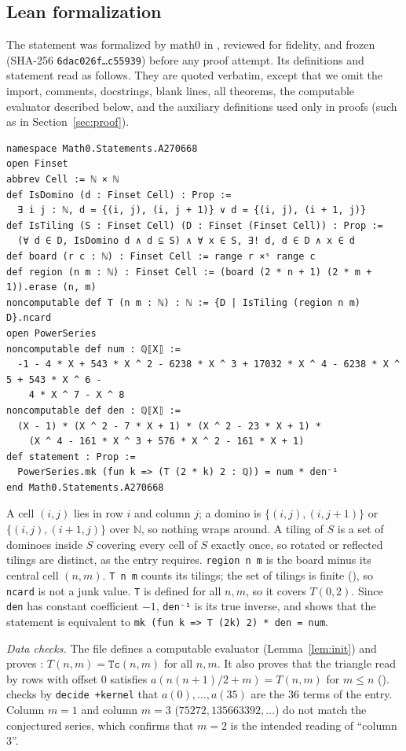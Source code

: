 \documentclass[11pt]{amsart}
\theoremstyle{plain}
\theoremstyle{definition}
\newcommand{\N}{\mathbb{N}}
\begin{document}
\subsection*{Lean formalization}
The statement was formalized by math0 in , reviewed for fidelity, and frozen (SHA-256 \texttt{6dac026f\ldots c55939}) before any proof attempt. Its definitions and statement read as follows. They are quoted verbatim, except that we omit the import, comments, docstrings, blank lines, all theorems, the computable evaluator described below, and the auxiliary definitions used only in proofs (such as  in Section~\ref{sec:proof}).
\begin{lstlisting}[basicstyle=\ttfamily\scriptsize]
namespace Math0.Statements.A270668
open Finset
abbrev Cell := ℕ × ℕ
def IsDomino (d : Finset Cell) : Prop :=
  ∃ i j : ℕ, d = {(i, j), (i, j + 1)} ∨ d = {(i, j), (i + 1, j)}
def IsTiling (S : Finset Cell) (D : Finset (Finset Cell)) : Prop :=
  (∀ d ∈ D, IsDomino d ∧ d ⊆ S) ∧ ∀ x ∈ S, ∃! d, d ∈ D ∧ x ∈ d
def board (r c : ℕ) : Finset Cell := range r ×ˢ range c
def region (n m : ℕ) : Finset Cell := (board (2 * n + 1) (2 * m + 1)).erase (n, m)
noncomputable def T (n m : ℕ) : ℕ := {D | IsTiling (region n m) D}.ncard
open PowerSeries
noncomputable def num : ℚ⟦X⟧ :=
  -1 - 4 * X + 543 * X ^ 2 - 6238 * X ^ 3 + 17032 * X ^ 4 - 6238 * X ^ 5 + 543 * X ^ 6 -
    4 * X ^ 7 - X ^ 8
noncomputable def den : ℚ⟦X⟧ :=
  (X - 1) * (X ^ 2 - 7 * X + 1) * (X ^ 2 - 23 * X + 1) *
    (X ^ 4 - 161 * X ^ 3 + 576 * X ^ 2 - 161 * X + 1)
def statement : Prop :=
  PowerSeries.mk (fun k => (T (2 * k) 2 : ℚ)) = num * den⁻¹
end Math0.Statements.A270668
\end{lstlisting}
A cell $(i,j)$ lies in row $i$ and column $j$; a domino is $\{(i,j),(i,j+1)\}$ or $\{(i,j),(i+1,j)\}$ over $\N$, so nothing wraps around. A tiling of $S$ is a set of dominoes inside $S$ covering every cell of $S$ exactly once, so rotated or reflected tilings are distinct, as the entry requires. \texttt{region n m} is the board minus its central cell $(n,m)$. \texttt{T n m} counts its tilings; the set of tilings is finite (), so \texttt{ncard} is not a junk value. \texttt{T} is defined for all $n,m$, so it covers $T(0,2)$. Since \texttt{den} has constant coefficient $-1$, \texttt{den⁻¹} is its true inverse, and  shows that the statement is equivalent to \texttt{mk (fun k => T (2k) 2) * den = num}.

\emph{Data checks.} The file defines a computable evaluator  (Lemma~\ref{lem:init}) and proves : $T(n,m)=\texttt{Tc}(n,m)$ for all $n,m$. It also proves that the triangle  read by rows with offset $0$ satisfies $a(n(n+1)/2+m)=T(n,m)$ for $m\le n$ ().  checks by \texttt{decide +kernel} that $a(0),\dots,a(35)$ are the $36$ terms of the entry. Column $m=1$ and column $m=3$ ($75272,135663392,\dots$) do not match the conjectured series, which confirms that $m=2$ is the intended reading of ``column 3''.
\end{document}
